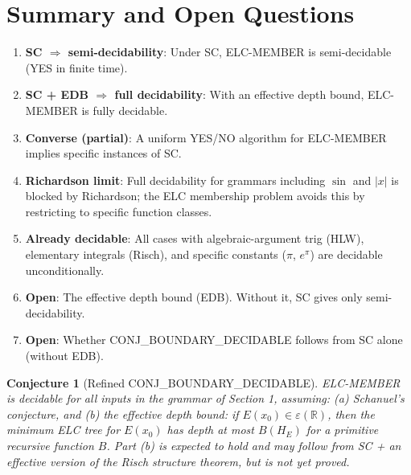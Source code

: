 \documentclass[11pt]{article}
\newtheorem{conjecture}[theorem]{Conjecture}
\begin{document}
\section{Summary and Open Questions}

\begin{enumerate}
  \item \textbf{SC $\Rightarrow$ semi-decidability}: Under SC, ELC-MEMBER is semi-decidable (YES in finite time).
  \item \textbf{SC + EDB $\Rightarrow$ full decidability}: With an effective depth bound, ELC-MEMBER is fully decidable.
  \item \textbf{Converse (partial)}: A uniform YES/NO algorithm for ELC-MEMBER implies specific instances of SC.
  \item \textbf{Richardson limit}: Full decidability for grammars including $\sin$ and $|x|$ is blocked by Richardson; the ELC membership problem avoids this by restricting to specific function classes.
  \item \textbf{Already decidable}: All cases with algebraic-argument trig (HLW), elementary integrals (Risch), and specific constants ($\pi$, $e^\pi$) are decidable unconditionally.
  \item \textbf{Open}: The effective depth bound (EDB). Without it, SC gives only semi-decidability.
  \item \textbf{Open}: Whether CONJ\_BOUNDARY\_DECIDABLE follows from SC alone (without EDB).
\end{enumerate}

\begin{conjecture}[Refined CONJ\_BOUNDARY\_DECIDABLE]
ELC-MEMBER is decidable for all inputs in the grammar of Section 1, assuming:
(a) Schanuel's conjecture, and
(b) the effective depth bound: if $E(x_0)\in\varepsilon(\mathbb{R})$, then the minimum ELC tree
for $E(x_0)$ has depth at most $B(H_E)$ for a primitive recursive function $B$.
Part (b) is expected to hold and may follow from SC + an effective version of
the Risch structure theorem, but is not yet proved.
\end{conjecture}
\end{document}
